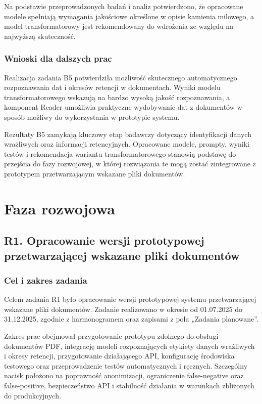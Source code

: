 \documentclass[12pt,a4paper]{report}
\begin{document}
Na podstawie przeprowadzonych badań i analiz potwierdzono, że opracowane modele spełniają wymagania jakościowe określone w opisie kamienia milowego, a model transformatorowy jest rekomendowany do wdrożenia ze względu na najwyższą skuteczność.

\subsection{Wnioski dla dalszych prac}
Realizacja zadania B5 potwierdziła możliwość skutecznego automatycznego rozpoznawania dat i okresów retencji w dokumentach. Wyniki modelu transformatorowego wskazują na bardzo wysoką jakość rozpoznawania, a komponent Reader umożliwia praktyczne wydobywanie dat z dokumentów w sposób możliwy do wykorzystania w prototypie systemu.

Rezultaty B5 zamykają kluczowy etap badawczy dotyczący identyfikacji danych wrażliwych oraz informacji retencyjnych. Opracowane modele, prompty, wyniki testów i rekomendacja wariantu transformatorowego stanowią podstawę do przejścia do fazy rozwojowej, w której rozwiązania te mogą zostać zintegrowane z prototypem przetwarzającym wskazane pliki dokumentów.


\chapter{Faza rozwojowa}



\section{R1. Opracowanie wersji prototypowej przetwarzającej wskazane pliki dokumentów}
\subsection{Cel i zakres zadania}
Celem zadania R1 było opracowanie wersji prototypowej systemu przetwarzającej wskazane pliki dokumentów. Zadanie realizowano w okresie od 01.07.2025 do 31.12.2025, zgodnie z harmonogramem oraz zapisami z pola „Zadania planowane”.

Zakres prac obejmował przygotowanie prototypu zdolnego do obsługi dokumentów PDF, integrację modeli rozpoznających etykiety danych wrażliwych i okresy retencji, przygotowanie działającego API, konfigurację środowiska testowego oraz przeprowadzenie testów automatycznych i ręcznych. Szczególny nacisk położono na poprawność anonimizacji, ograniczenie false-negative oraz false-positive, bezpieczeństwo API i stabilność działania w warunkach zbliżonych do produkcyjnych.
\end{document}
